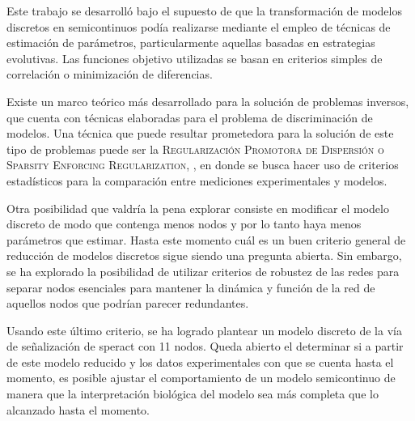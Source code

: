 Este trabajo se desarrolló bajo el supuesto de que la transformación de modelos discretos en semicontinuos podía realizarse mediante el empleo de técnicas de estimación de parámetros, particularmente aquellas basadas en estrategias evolutivas. Las funciones objetivo utilizadas se basan en criterios simples de correlación o minimización de diferencias. 

Existe un marco teórico más desarrollado para la solución de problemas inversos, que cuenta con técnicas elaboradas para el problema de discriminación de modelos. Una técnica que puede resultar prometedora para la solución de este tipo de problemas puede ser la \textsc{Regularización Promotora de Dispersión o Sparsity Enforcing Regularization}, \citeauthor{Engl2009} \citep{Engl2009}, en donde se busca hacer uso de criterios estadísticos para la comparación entre mediciones experimentales y modelos.

Otra posibilidad que valdría la pena explorar consiste en modificar el modelo discreto de modo que contenga menos nodos y por lo tanto haya menos parámetros que estimar. Hasta este momento cuál es un buen criterio general de reducción de modelos discretos sigue siendo una pregunta abierta. Sin embargo, se ha explorado la posibilidad de utilizar criterios de robustez de las redes para separar nodos esenciales para mantener la dinámica y función de la red de aquellos nodos que podrían parecer redundantes.

Usando este último criterio, se ha logrado plantear un modelo discreto de la vía de señalización de speract con 11 nodos. Queda abierto el determinar si a partir de este modelo reducido y los datos experimentales con que se cuenta hasta el momento, es posible ajustar el comportamiento de un modelo semicontinuo de manera que la interpretación biológica del modelo sea más completa que lo alcanzado hasta el momento.

%


